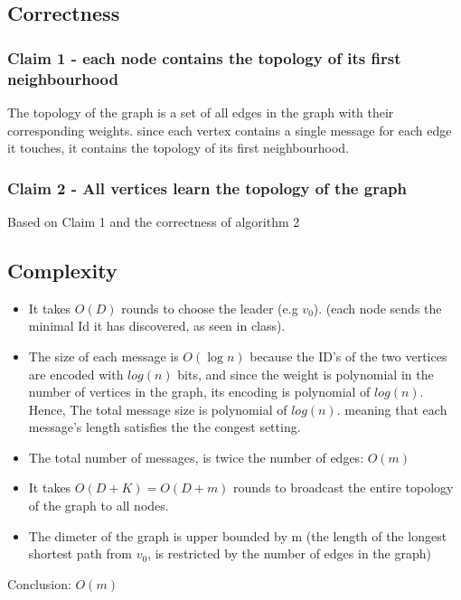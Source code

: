 \documentclass[11pt]{article}
\begin{document}
\subsection*{Correctness}
\subsubsection{Claim 1 - each node contains the topology of its first neighbourhood}
The topology of the graph is a set of all edges in the graph with their corresponding weights. since each vertex contains a single message for each edge it touches, it contains the topology of its first neighbourhood.

\subsubsection{Claim 2 - All vertices learn the topology of the graph }
Based on Claim 1 and the correctness of algorithm 2


\subsection*{Complexity}
\begin{itemize}
    \item It takes $O(D)$ rounds to choose the leader (e.g $v_0$). (each node sends the minimal Id it has discovered, as seen in class).
    \item The size of each message is $O(\log{n})$ because the ID's of the two vertices are encoded with $log(n)$ bits, and since the weight is polynomial in the number of vertices in the graph, its encoding is polynomial of $log(n)$. Hence, The total message size is polynomial of $log(n)$. meaning that each message's length satisfies the the congest setting.
    
    \item The total number of messages, is twice the number of edges: $O(m)$
    \item It takes $O(D+K)=O(D+m)$ rounds to broadcast the entire topology of the graph to all nodes.
    \item The dimeter of the graph is upper bounded by m (the length of the longest shortest path from $v_0$, is restricted by the number of edges in the graph)
\end{itemize}
Conclusion: $O(m)$
\end{document}
